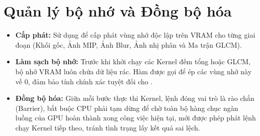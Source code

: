 \section{Quản lý bộ nhớ và Đồng bộ hóa}

\begin{itemize}
    \item \textbf{Cấp phát:} Sử dụng  để cấp phát vùng nhớ độc lập trên VRAM cho từng giai đoạn (Khối gốc, Ảnh MIP, Ảnh Blur, Ảnh nhị phân và Ma trận GLCM).
    
    \item \textbf{Làm sạch bộ nhớ:} Trước khi khởi chạy các Kernel đếm tổng hoặc GLCM, bộ nhớ VRAM luôn chứa dữ liệu rác. Hàm  được gọi để ép các vùng nhớ này về 0, đảm bảo tính chính xác tuyệt đối cho .
    
    \item \textbf{Đồng bộ hóa:} Giữa mỗi bước thực thi Kernel, lệnh  đóng vai trò là rào chắn (Barrier), bắt buộc CPU phải tạm dừng để chờ toàn bộ hàng chục ngàn luồng của GPU hoàn thành xong công việc hiện tại, mới được phép phát lệnh chạy Kernel tiếp theo, tránh tình trạng lấy kết quả sai lệch.
\end{itemize}


